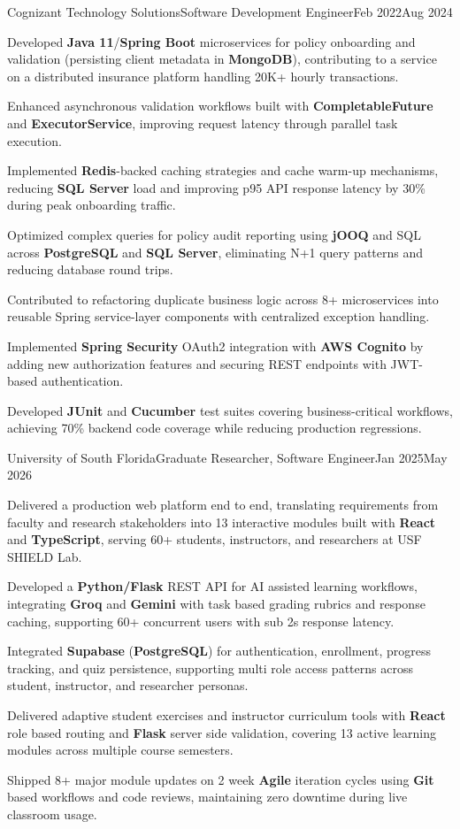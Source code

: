 \documentclass[a4paper,10pt]{article}
\newcommand{\resumeItem}[1]{
  \item\small{#1}
}
\begin{document}
  \resumeSubheading
    {Cognizant Technology Solutions}{Software Development Engineer}{Feb 2022}{Aug 2024}
  \resumeItemListStart
    \resumeItem{Developed \textbf{Java 11}/\textbf{Spring Boot} microservices for policy onboarding and validation (persisting client metadata in \textbf{MongoDB}), contributing to a service on a distributed insurance platform handling 20K+ hourly transactions.}
    \resumeItem{Enhanced asynchronous validation workflows built with \textbf{CompletableFuture} and \textbf{ExecutorService}, improving request latency through parallel task execution.}
    \resumeItem{Implemented \textbf{Redis}-backed caching strategies and cache warm-up mechanisms, reducing \textbf{SQL Server} load and improving p95 API response latency by 30\% during peak onboarding traffic.}
    \resumeItem{Optimized complex queries for policy audit reporting using \textbf{jOOQ} and SQL across \textbf{PostgreSQL} and \textbf{SQL Server}, eliminating N+1 query patterns and reducing database round trips.}
    \resumeItem{Contributed to refactoring duplicate business logic across 8+ microservices into reusable Spring service-layer components with centralized exception handling.}
    \resumeItem{Implemented \textbf{Spring Security} OAuth2 integration with \textbf{AWS Cognito} by adding new authorization features and securing REST endpoints with JWT-based authentication.}
    \resumeItem{Developed \textbf{JUnit} and \textbf{Cucumber} test suites covering business-critical workflows, achieving 70\% backend code coverage while reducing production regressions.}
  \resumeItemListEnd

  \resumeSubheading
    {University of South Florida}{Graduate Researcher, Software Engineer}{Jan 2025}{May 2026}
  \resumeItemListStart
    \resumeItem{Delivered a production web platform end to end, translating requirements from faculty and research stakeholders into 13 interactive modules built with \textbf{React} and \textbf{TypeScript}, serving 60+ students, instructors, and researchers at USF SHIELD Lab.}
    \resumeItem{Developed a \textbf{Python/Flask} REST API for AI assisted learning workflows, integrating \textbf{Groq} and \textbf{Gemini} with task based grading rubrics and response caching, supporting 60+ concurrent users with sub 2s response latency.}
    \resumeItem{Integrated \textbf{Supabase} (\textbf{PostgreSQL}) for authentication, enrollment, progress tracking, and quiz persistence, supporting multi role access patterns across student, instructor, and researcher personas.}
    \resumeItem{Delivered adaptive student exercises and instructor curriculum tools with \textbf{React} role based routing and \textbf{Flask} server side validation, covering 13 active learning modules across multiple course semesters.}
    \resumeItem{Shipped 8+ major module updates on 2 week \textbf{Agile} iteration cycles using \textbf{Git} based workflows and code reviews, maintaining zero downtime during live classroom usage.}
  \resumeItemListEnd
\end{document}
